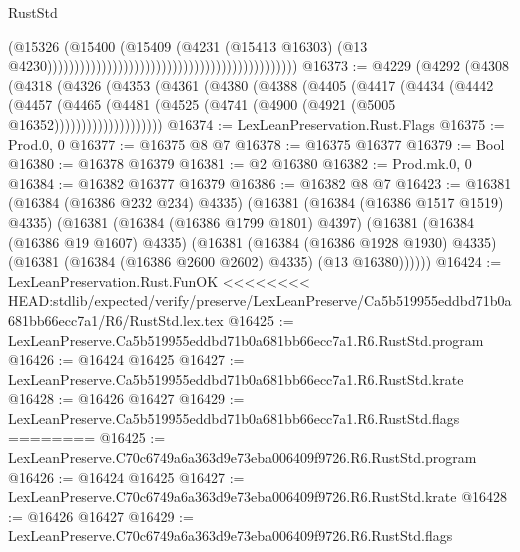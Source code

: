 \begin{lexlean}{RustStd}
\begin{coremodule}
{\begin{coremodule}
{{{{{{{{{{{{{{{{{{{{{{{{{{{{{{{{{{{{{{{{{{{{{{{{{{{{{{{                                                                                      (@15326
                                                                                        (@15400
                                                                                          (@15409
                                                                                            (@4231
                                                                                              (@15413
                                                                                                @16303)
                                                                                              (@13
                                                                                                @4230))))))))))))))))))))))))))))))))))))))))))))))
@16373 := @4229
    (@4292
      (@4308
        (@4318
          (@4326
            (@4353
              (@4361
                (@4380
                  (@4388
                    (@4405
                      (@4417
                        (@4434
                          (@4442
                            (@4457
                              (@4465
                                (@4481 (@4525 (@4741 (@4900 (@4921 (@5005 @16352))))))))))))))))))))
@16374 := LexLeanPreservation.Rust.Flags
@16375 := Prod.{0, 0}
@16377 := @16375 @8 @7
@16378 := @16375 @16377
@16379 := Bool
@16380 := @16378 @16379
@16381 := @2 @16380
@16382 := Prod.mk.{0, 0}
@16384 := @16382 @16377 @16379
@16386 := @16382 @8 @7
@16423 := @16381
    (@16384 (@16386 @232 @234) @4335)
    (@16381
      (@16384 (@16386 @1517 @1519) @4335)
      (@16381
        (@16384 (@16386 @1799 @1801) @4397)
        (@16381
          (@16384 (@16386 @19 @1607) @4335)
          (@16381
            (@16384 (@16386 @1928 @1930) @4335)
            (@16381 (@16384 (@16386 @2600 @2602) @4335) (@13 @16380))))))
@16424 := LexLeanPreservation.Rust.FunOK
<<<<<<<< HEAD:stdlib/expected/verify/preserve/LexLeanPreserve/Ca5b519955eddbd71b0a681bb66ecc7a1/R6/RustStd.lex.tex
@16425 := LexLeanPreserve.Ca5b519955eddbd71b0a681bb66ecc7a1.R6.RustStd.program
@16426 := @16424 @16425
@16427 := LexLeanPreserve.Ca5b519955eddbd71b0a681bb66ecc7a1.R6.RustStd.krate
@16428 := @16426 @16427
@16429 := LexLeanPreserve.Ca5b519955eddbd71b0a681bb66ecc7a1.R6.RustStd.flags
========
@16425 := LexLeanPreserve.C70c6749a6a363d9e73eba006409f9726.R6.RustStd.program
@16426 := @16424 @16425
@16427 := LexLeanPreserve.C70c6749a6a363d9e73eba006409f9726.R6.RustStd.krate
@16428 := @16426 @16427
@16429 := LexLeanPreserve.C70c6749a6a363d9e73eba006409f9726.R6.RustStd.flags
}}}}}}}}}}}}}}}}}}}}}}}}}}}}}}}}}}}}}}}}}}}}}}}}}}}}}}}
\end{coremodule}}
\end{coremodule}
\end{lexlean}
